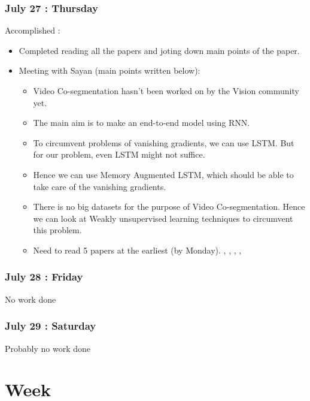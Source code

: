 \documentclass{article}
\begin{document}
\subsubsection{July 27 : Thursday}
Accomplished :
\begin{itemize}
\item Completed reading all the papers and joting down main points of the paper.
\item Meeting with Sayan (main points written below):
  \begin{itemize}
  \item Video Co-segmentation hasn't been worked on by the Vision community yet.
  \item The main aim is to make an end-to-end model using RNN.
  \item To circumvent problems of vanishing gradients, we can use LSTM. But for our problem, even LSTM might not suffice.
  \item Hence we can use Memory Augmented LSTM, which should be able to take care of the vanishing gradients.
  \item There is no big datasets for the purpose of Video Co-segmentation. Hence we can look at Weakly unsupervised learning techniques to circumvent this problem.
  \item Need to read 5 papers at the earliest (by Monday). \cite{DBLP:journals/corr/SiamVJR16}, \cite{DBLP:journals/corr/JainZSS15}, \cite{PAVEL2017105}, \cite{DBLP:journals/corr/NohHH15}, \cite{DBLP:journals/corr/GulcehreCB17}
  \end{itemize}
\end{itemize}

\subsubsection{July 28 : Friday}
No work done

\subsubsection{July 29 : Saturday}
Probably no work done

\section{Week}
\end{document}
